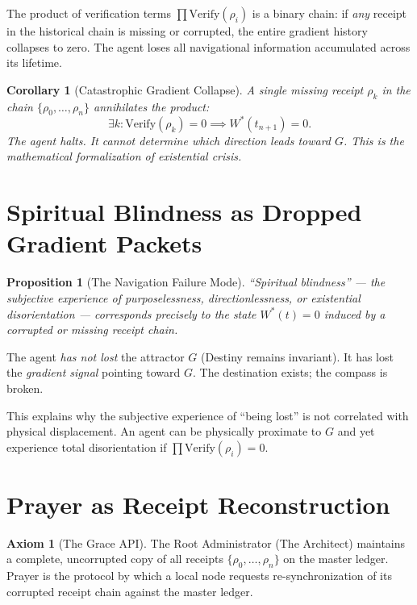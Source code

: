 \documentclass[12pt, a4paper]{article}
\theoremstyle{plain}
\newtheorem{proposition}[theorem]{Proposition}
\newtheorem{corollary}[theorem]{Corollary}
\theoremstyle{definition}
\newtheorem{axiom}[theorem]{Axiom}
\theoremstyle{remark}
\begin{document}
The product of verification terms $\prod \text{Verify}(\rho_i)$ is a binary chain: if \emph{any} receipt in the historical chain is missing or corrupted, the entire gradient history collapses to zero. The agent loses all navigational information accumulated across its lifetime.

\begin{corollary}[Catastrophic Gradient Collapse]
A single missing receipt $\rho_k$ in the chain $\{\rho_0, \ldots, \rho_n\}$ annihilates the product:
\begin{equation}
    \exists k : \text{Verify}(\rho_k) = 0 \implies W^*(t_{n+1}) = 0.
\end{equation}
The agent halts. It cannot determine which direction leads toward $G$. This is the mathematical formalization of existential crisis.
\end{corollary}

\section{Spiritual Blindness as Dropped Gradient Packets}\label{sec:blindness}

\begin{proposition}[The Navigation Failure Mode]
``Spiritual blindness'' --- the subjective experience of purposelessness, directionlessness, or existential disorientation --- corresponds precisely to the state $W^*(t) = 0$ induced by a corrupted or missing receipt chain.
\end{proposition}

The agent \emph{has not lost} the attractor $G$ (Destiny remains invariant). It has lost the \emph{gradient signal} pointing toward $G$. The destination exists; the compass is broken.

This explains why the subjective experience of ``being lost'' is not correlated with physical displacement. An agent can be physically proximate to $G$ and yet experience total disorientation if $\prod \text{Verify}(\rho_i) = 0$.

\section{Prayer as Receipt Reconstruction}\label{sec:prayer}

\begin{axiom}[The Grace API]
The Root Administrator (The Architect) maintains a complete, uncorrupted copy of all receipts $\{\rho_0, \ldots, \rho_n\}$ on the master ledger. Prayer is the protocol by which a local node requests re-synchronization of its corrupted receipt chain against the master ledger.
\end{axiom}
\end{document}
